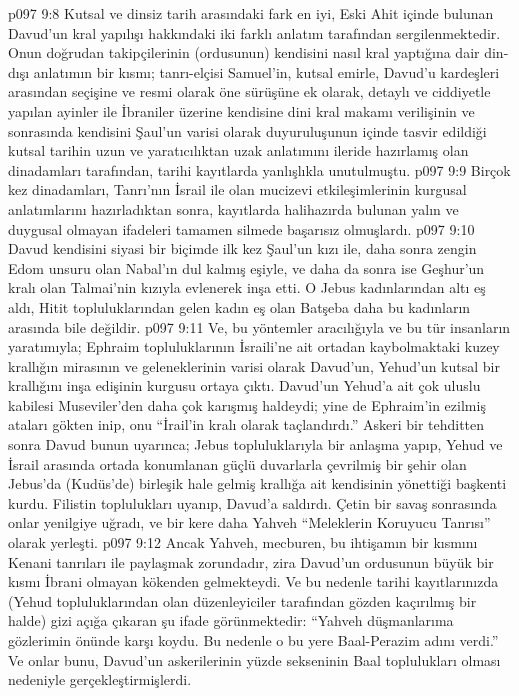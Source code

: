\vs p097 9:8 Kutsal ve dinsiz tarih arasındaki fark en iyi, Eski Ahit içinde bulunan Davud’un kral yapılışı hakkındaki iki farklı anlatım tarafından sergilenmektedir. Onun doğrudan takipçilerinin (ordusunun) kendisini nasıl kral yaptığına dair din\hyp{}dışı anlatımın bir kısmı; tanrı\hyp{}elçisi Samuel’in, kutsal emirle, Davud’u kardeşleri arasından seçişine ve resmi olarak öne sürüşüne ek olarak, detaylı ve ciddiyetle yapılan ayinler ile İbraniler üzerine kendisine dini kral makamı verilişinin ve sonrasında kendisini Şaul’un varisi olarak duyuruluşunun içinde tasvir edildiği kutsal tarihin uzun ve yaratıcılıktan uzak anlatımını ileride hazırlamış olan dinadamları tarafından, tarihi kayıtlarda yanlışlıkla unutulmuştu.
\vs p097 9:9 Birçok kez dinadamları, Tanrı’nın İsrail ile olan mucizevi etkileşimlerinin kurgusal anlatımlarını hazırladıktan sonra, kayıtlarda halihazırda bulunan yalın ve duygusal olmayan ifadeleri tamamen silmede başarısız olmuşlardı.
\vs p097 9:10 Davud kendisini siyasi bir biçimde ilk kez Şaul’un kızı ile, daha sonra zengin Edom unsuru olan Nabal’ın dul kalmış eşiyle, ve daha da sonra ise Geşhur’un kralı olan Talmai’nin kızıyla evlenerek inşa etti. O Jebus kadınlarından altı eş aldı, Hitit topluluklarından gelen kadın eş olan Batşeba daha bu kadınların arasında bile değildir.
\vs p097 9:11 Ve, bu yöntemler aracılığıyla ve bu tür insanların yaratımıyla; Ephraim topluluklarının İsraili’ne ait ortadan kaybolmaktaki kuzey krallığın mirasının ve geleneklerinin varisi olarak Davud’un, Yehud’un kutsal bir krallığını inşa edişinin kurgusu ortaya çıktı. Davud’un Yehud’a ait çok uluslu kabilesi Museviler’den daha çok karışmış haldeydi; yine de Ephraim’in ezilmiş ataları gökten inip, onu “İrail’in kralı olarak taçlandırdı.” Askeri bir tehditten sonra Davud bunun uyarınca; Jebus topluluklarıyla bir anlaşma yapıp, Yehud ve İsrail arasında ortada konumlanan güçlü duvarlarla çevrilmiş bir şehir olan Jebus’da (Kudüs’de) birleşik hale gelmiş krallığa ait kendisinin yönettiği başkenti kurdu. Filistin toplulukları uyanıp, Davud’a saldırdı. Çetin bir savaş sonrasında onlar yenilgiye uğradı, ve bir kere daha Yahveh “Meleklerin Koruyucu Tanrısı” olarak yerleşti.
\vs p097 9:12 Ancak Yahveh, mecburen, bu ihtişamın bir kısmını Kenani tanrıları ile paylaşmak zorundadır, zira Davud’un ordusunun büyük bir kısmı İbrani olmayan kökenden gelmekteydi. Ve bu nedenle tarihi kayıtlarınızda (Yehud topluluklarından olan düzenleyiciler tarafından gözden kaçırılmış bir halde) gizi açığa çıkaran şu ifade görünmektedir: “Yahveh düşmanlarıma gözlerimin önünde karşı koydu. Bu nedenle o bu yere Baal\hyp{}Perazim adını verdi.” Ve onlar bunu, Davud’un askerilerinin yüzde sekseninin Baal toplulukları olması nedeniyle gerçekleştirmişlerdi.

